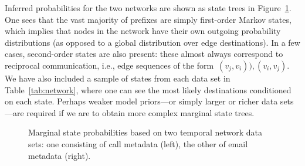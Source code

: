 \documentclass[11pt,a4paper]{article}
\begin{document}
Inferred probabilities for the two networks are shown as state trees in
Figure~\ref{fig:network}. One sees that the vast majority of prefixes are simply
first-order Markov states, which implies that nodes in the network have their
own outgoing probability distributions (as opposed to a global distribution over
edge destinations). In a few cases, second-order states are also present: these
almost always correspond to reciprocal communication, i.e., edge sequences of
the form~\((v_j, v_i)), (v_i, v_j)\). We have also included a sample of states
from each data set in Table~\ref{tab:network}, where one can see the most likely
destinations conditioned on each state. Perhaps weaker model priors---or simply
larger or richer data sets---are required if we are to obtain more complex
marginal state trees.
%
\begin{figure}[htbp]
\centering
\caption{Marginal state probabilities based on two temporal network data sets:
  one consisting of call metadata (left), the other of email metadata (right).}
\label{fig:network}
\end{figure}
%
\end{document}
